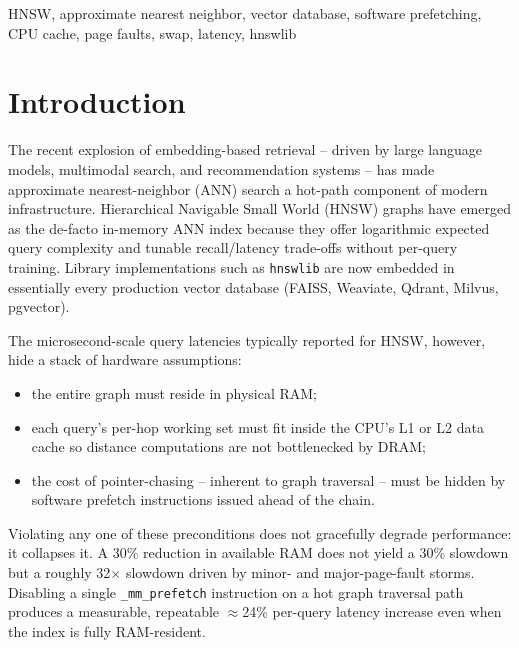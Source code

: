 \documentclass[conference]{IEEEtran}
\begin{document}
\begin{IEEEkeywords}
HNSW, approximate nearest neighbor, vector database, software prefetching,
CPU cache, page faults, swap, latency, hnswlib
\end{IEEEkeywords}

\section{Introduction}
The recent explosion of embedding-based retrieval -- driven by large language
models, multimodal search, and recommendation systems -- has made
approximate nearest-neighbor (ANN) search a hot-path component of modern
infrastructure. Hierarchical Navigable Small World (HNSW) graphs
\cite{malkov2018} have emerged as the de-facto in-memory ANN index because
they offer logarithmic expected query complexity and tunable
recall/latency trade-offs without per-query training. Library implementations
such as \texttt{hnswlib} \cite{hnswlib} are now embedded in essentially every
production vector database (FAISS, Weaviate, Qdrant, Milvus, pgvector).

The microsecond-scale query latencies typically reported for HNSW, however,
hide a stack of hardware assumptions:

\begin{itemize}
\item the entire graph must reside in physical RAM;
\item each query's per-hop working set must fit inside the CPU's L1 or L2
data cache so distance computations are not bottlenecked by DRAM;
\item the cost of pointer-chasing -- inherent to graph traversal -- must be
hidden by software prefetch instructions issued ahead of the chain.
\end{itemize}

\noindent
Violating any one of these preconditions does not gracefully degrade
performance: it collapses it. A 30\% reduction in available RAM does not
yield a 30\% slowdown but a roughly 32$\times$ slowdown driven by minor- and
major-page-fault storms. Disabling a single \texttt{\_mm\_prefetch}
instruction on a hot graph traversal path produces a measurable, repeatable
$\approx$24\% per-query latency increase even when the index is fully
RAM-resident.
\end{document}
